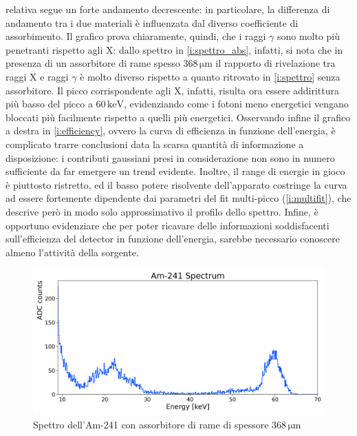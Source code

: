 \documentclass[twocolumn,10pt]{asme2ej}
\begin{document}
relativa segue un forte andamento decrescente: in particolare, la differenza di andamento tra i due materiali è
influenzata dal diverso coefficiente di assorbimento. Il grafico prova chiaramente, quindi, che i raggi $\gamma$ sono
molto più penetranti rispetto agli X: dallo spettro in \autoref{i:spettro_abs}, infatti, si nota che in presenza di un
assorbitore di rame spesso $368\,\si{\micro\metre}$ il rapporto di rivelazione tra raggi X e raggi $\gamma$ è molto
diverso rispetto a quanto ritrovato in \autoref{i:spettro} senza assorbitore. Il picco corrispondente agli X, infatti,
risulta ora essere addirittura più basso del picco a $60\,\si{\kilo\electronvolt}$, evidenziando come i fotoni meno
energetici vengano bloccati più facilmente rispetto a quelli più energetici. Osservando infine il grafico a destra in
\autoref{i:efficiency}, ovvero la curva di efficienza in funzione dell'energia, è complicato trarre conclusioni data la
scarsa quantità di informazione a disposizione: i contributi gaussiani presi in considerazione non sono in numero
sufficiente da far emergere un trend evidente. Inoltre, il range di energie in gioco è piuttosto ristretto, ed il basso
potere risolvente dell'apparato costringe la curva ad essere fortemente dipendente dai parametri del fit multi-picco
(\autoref{i:multifit}), che descrive però in modo solo approssimativo il profilo dello spettro. Infine, è opportuno
evidenziare che per poter ricavare delle informazioni soddisfacenti sull'efficienza del detector in funzione
dell'energia, sarebbe necessario conoscere almeno l'attività della sorgente. 


\begin{figure}
    \centering
    \includegraphics[width=\linewidth]{../Plots/am_spectrum_absorber.png}
    \caption{Spettro dell'Am-241 con assorbitore di rame di spessore $368\,\si{\micro\metre}$}
    \label{i:spettro_abs}
    \vspace{-10pt}
\end{figure}

\null
\vfill
\end{document}
